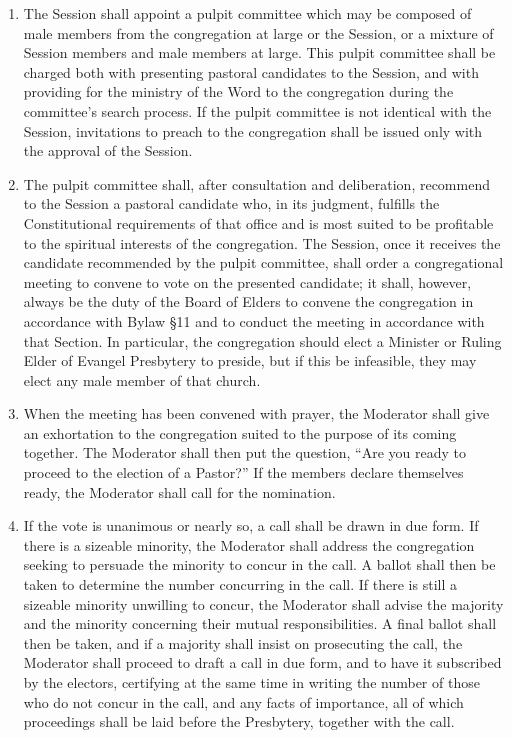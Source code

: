 \documentclass[
]{book}
\providecommand{\tightlist}{%
  \setlength{\itemsep}{0pt}\setlength{\parskip}{0pt}}
\begin{document}
\begin{enumerate}
  \begin{enumerate}
  \def\labelenumii{(\arabic{enumii})}
  \tightlist
  \item
    The Session shall appoint a pulpit committee which may be composed of male members from the congregation at large or the Session, or a mixture of Session members and male members at large. This pulpit committee shall be charged both with presenting pastoral candidates to the Session, and with providing for the ministry of the Word to the congregation during the committee's search process. If the pulpit committee is not identical with the Session, invitations to preach to the congregation shall be issued only with the approval of the Session.
  \item
    The pulpit committee shall, after consultation and deliberation, recommend to the Session a pastoral candidate who, in its judgment, fulfills the Constitutional requirements of that office and is most suited to be profitable to the spiritual interests of the congregation. The Session, once it receives the candidate recommended by the pulpit committee, shall order a congregational meeting to convene to vote on the presented candidate; it shall, however, always be the duty of the Board of Elders to convene the congregation in accordance with Bylaw §11 and to conduct the meeting in accordance with that Section. In particular, the congregation should elect a Minister or Ruling Elder of Evangel Presbytery to preside, but if this be infeasible, they may elect any male member of that church.
  \item
    When the meeting has been convened with prayer, the Moderator shall give an exhortation to the congregation suited to the purpose of its coming together. The Moderator shall then put the question, ``Are you ready to proceed to the election of a Pastor?'' If the members declare themselves ready, the Moderator shall call for the nomination.
  \item
    If the vote is unanimous or nearly so, a call shall be drawn in due form. If there is a sizeable minority, the Moderator shall address the congregation seeking to persuade the minority to concur in the call. A ballot shall then be taken to determine the number concurring in the call. If there is still a sizeable minority unwilling to concur, the Moderator shall advise the majority and the minority concerning their mutual responsibilities. A final ballot shall then be taken, and if a majority shall insist on prosecuting the call, the Moderator shall proceed to draft a call in due form, and to have it subscribed by the electors, certifying at the same time in writing the number of those who do not concur in the call, and any facts of importance, all of which proceedings shall be laid before the Presbytery, together with the call.

\end{enumerate}
\end{enumerate}
\end{document}
